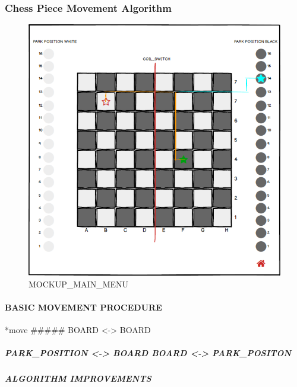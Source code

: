 \documentclass[
  english,
  paper=a4,
  ,captions=tableheading
]{scrartcl}
\begin{document}
\hypertarget{chess-piece-movement-algorithm}{%
\subsubsection{Chess Piece Movement
Algorithm}\label{chess-piece-movement-algorithm}}

\begin{figure}
\centering
\includegraphics{./images/ATC_ChessMoveAlgorithm.png}
\caption{MOCKUP\_MAIN\_MENU}
\end{figure}

\hypertarget{basic-movement-procedure}{%
\paragraph{BASIC MOVEMENT PROCEDURE}\label{basic-movement-procedure}}

*move \#\#\#\#\# BOARD \textless{}-\textgreater{} BOARD

\hypertarget{park_position---board-board---park_positon}{%
\subparagraph{PARK\_POSITION \textless{}-\textgreater{} BOARD
\textbar{}\textbar{} BOARD \textless{}-\textgreater{}
PARK\_POSITON}\label{park_position---board-board---park_positon}}

\hypertarget{algorithm-improvements}{%
\subparagraph{ALGORITHM IMPROVEMENTS}\label{algorithm-improvements}}
\end{document}
